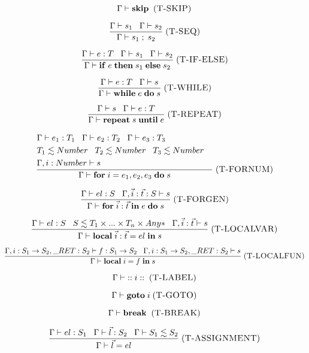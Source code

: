 \documentclass[12pt]{article}
\newcommand{\mylabel}[1]{\; (\textsc{#1})}
\newcommand{\kw}[1]{\mathbf{#1} \;}
\newcommand{\env}{\Gamma}
\newcommand{\ret}{\string_RET}
\begin{document}
\[
\env \vdash \kw{skip}
\mylabel{T-SKIP}
\]

\[
\frac{\env \vdash s_{1} \;\;\;
      \env \vdash s_{2}}
     {\env \vdash s_{1} \;;\; s_{2}}
\mylabel{T-SEQ}
\]

\[
\frac{\env \vdash e:T \;\;\;
      \env \vdash s_{1} \;\;\;
      \env \vdash s_{2}}
     {\env \vdash \kw{if} e \; \kw{then} s_{1} \; \kw{else} s_{2}}
\mylabel{T-IF-ELSE}
\]

\[
\frac{\env \vdash e:T \;\;\;
      \env \vdash s}
     {\env \vdash \kw{while} e \; \kw{do} s}
\mylabel{T-WHILE}
\]

\[
\frac{\env \vdash s \;\;\;
      \env \vdash e:T}
     {\env \vdash \kw{repeat} s \; \kw{until} e}
\mylabel{T-REPEAT}
\]

\[
\frac{\begin{aligned}
      & \env \vdash e_{1}:T_{1} \;\;\;
        \env \vdash e_{2}:T_{2} \;\;\;
        \env \vdash e_{3}:T_{3} &\\
      & T_{1} \lesssim Number \;\;\;
        T_{2} \lesssim Number \;\;\;
        T_{3} \lesssim Number &\\
      & \env, i:Number \vdash s &
      \end{aligned}}
     {\env \vdash \kw{for} i=e_{1},e_{2},e_{3} \; \kw{do} s}
\mylabel{T-FORNUM}
\]

\[
\frac{\env \vdash el:S \;\;\;
      \env, \vec{i}:\vec{t}:S \vdash s}
     {\env \vdash \kw{for} \vec{i}:\vec{t} \; \kw{in} e \; \kw{do} s}
\mylabel{T-FORGEN}
\]

\[
\frac{\env \vdash el:S \;\;\;
      S \lesssim T_{1} \times ... \times T_{n} \times {Any*} \;\;\;
      \env, \vec{i}:\vec{t} \vdash s}
     {\env \vdash \kw{local} \vec{i}:\vec{t} = el \; \kw{in} s}
\mylabel{T-LOCALVAR}
\]

\[
\frac{\env, i:S_{1} \rightarrow S_{2}, \ret:S_{2} \vdash f:S_{1} \rightarrow S_{2} \;\;\;
      \env, i:S_{1} \rightarrow S_{2}, \ret:S_{2} \vdash s}
     {\env \vdash \kw{local} i = f \; \kw{in} s}
\mylabel{T-LOCALFUN}
\]

\[
\env \vdash \kw{::} i \; \kw{::}
\mylabel{T-LABEL}
\]

\[
\env \vdash \kw{goto} i
\mylabel{T-GOTO}
\]

\[
\env \vdash \kw{break}
\mylabel{T-BREAK}
\]

\[
\frac{\env \vdash el:S_{1} \;\;\;
      \env \vdash \vec{l}:S_{2} \;\;\;
      \env \vdash S_{1} \lesssim S_{2}}
     {\env \vdash \vec{l} = el}
\mylabel{T-ASSIGNMENT}
\]
\end{document}

